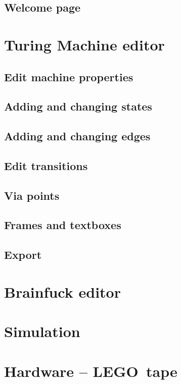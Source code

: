 \documentclass[%
  a4paper,%
  11pt,%
  blue,%
  ]{tubsartcl}
\begin{document}
\subsection{Welcome page}
\label{sec:welcome-page}


\section{Turing Machine editor}

\subsection{Edit machine properties}
\label{sec:edit-mach-prop}

\subsection{Adding and changing states}
\label{sec:add-edit-states}

\subsection{Adding and changing edges}
\label{sec:adding-chang-edges}

\subsection{Edit transitions}
\label{sec:edit-transitions}

\subsection{Via points}
\label{sec:via-points}

\subsection{Frames and textboxes}
\label{sec:frames-textboxes}

\subsection{Export}
\label{sec:export}

\section{Brainfuck editor}



\section{Simulation}



\section{Hardware -- LEGO\textregistered\, tape}

\makebackpage[trisec]%
\end{document}
